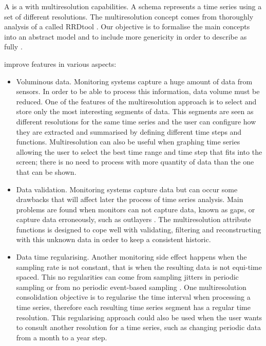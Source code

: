 A  is a  with multiresolution capabilities.  A
 schema represents a time series using a set of different
resolutions.  The multiresolution concept comes from thoroughly
analysis of a  called RRDtool \cite{rrdtool}. Our objective is to
formalise the main concepts into an abstract model and to include more
genericity in order to describe  as fully .



 improve  features in various aspects:
\begin{itemize}

\item Voluminous data. Monitoring systems capture a huge amount of
  data from sensors. In order to be able to process this information,
  data volume must be reduced. One of the features of the
  multiresolution approach is to select and store only the most
  interesting segments of data. This segments are seen as different
  resolutions for the same time series and the user can configure how
  they are extracted and summarised by defining different time steps
  and functions. Multiresolution can also be useful when graphing time
  series allowing the user to select the best time range and time
  step that fits into the screen; there is no need to process with
  more quantity of data than the one that can be
  shown.%

\item Data validation. Monitoring systems capture data but can occur
  some drawbacks that will affect later the process of time series
  analysis. Main problems are found when monitors can not capture
  data, known as gaps, or capture data erroneously, such as outlayers
  \cite{quevedo10}.  The multiresolution attribute functions is
  designed to cope well with validating, filtering and reconstructing
  with this unknown data in order to keep a consistent
  historic.%

\item Data time regularising. Another monitoring side effect happens
  when the sampling rate is not constant, that is when the resulting
  data is not equi-time spaced. This no regularities can come from
  sampling jitters in periodic sampling or from no periodic
  event-based sampling \cite{kopetz11:realtime}. One multiresolution
  consolidation objective is to regularise the time interval when
  processing a time series, therefore each resulting time series
  segment has a regular time resolution. This regularising approach
  could also be used when the user wants to consult another resolution
  for a time series, such as changing periodic data from a month to a
  year step. %


\end{itemize}
